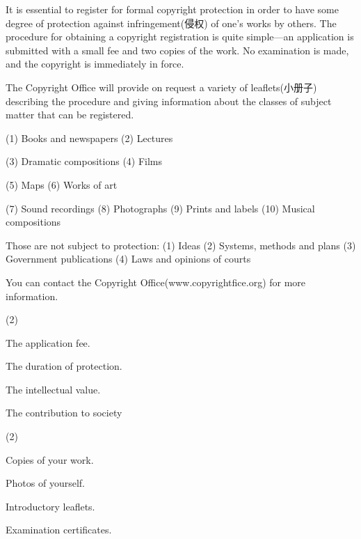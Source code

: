 \documentclass{英语试卷}
\begin{document}
\par It is essential to register for formal copyright protection in order to have some degree of protection against infringement(侵权) of one's works by others. The procedure for obtaining a copyright registration is quite simple—an application is submitted with a small fee and two copies of the work. No examination is made, and the copyright is immediately in force.\par
\par The Copyright Office will provide on request a variety of leaflets(小册子) describing the procedure and giving information about the classes of subject matter that can be registered.\par
\par (1) Books and newspapers (2) Lectures\par
\par (3) Dramatic compositions (4) Films\par
\par (5) Maps (6) Works of art\par
\par (7) Sound recordings (8) Photographs (9) Prints and labels (10) Musical compositions\par
\par Those are not subject to protection: (1) Ideas (2) Systems, methods and plans (3) Government publications (4) Laws and opinions of courts\par
\par You can contact the Copyright Office(www.copyrightfice.org) for more information.\par
{}
\begin{choices}(2)
  \item The application fee.
  \item The duration of protection.
  \item The intellectual value.
  \item The contribution to society
\end{choices}
\begin{choices}(2)
  \item Copies of your work.
  \item Photos of yourself.
  \item Introductory leaflets.
  \item Examination certificates.
\end{choices}
\end{document}

